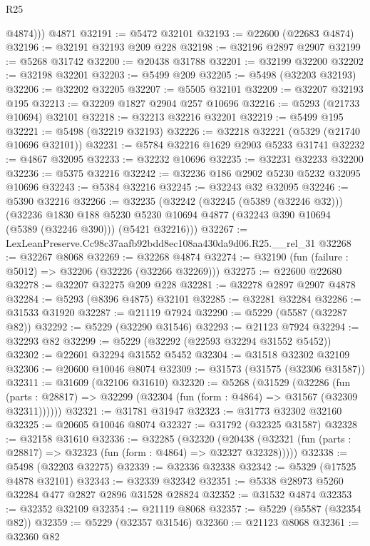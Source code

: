 \begin{lexlean}{R25}
\begin{coremodule}
          @4874)))
    @4871
@32191 := @5472 @32101
@32193 := @22600 (@22683 @4874)
@32196 := @32191 @32193 @209 @228
@32198 := @32196 @2897 @2907
@32199 := @5268 @31742
@32200 := @20438 @31788
@32201 := @32199 @32200
@32202 := @32198 @32201
@32203 := @5499 @209
@32205 := @5498 (@32203 @32193)
@32206 := @32202 @32205
@32207 := @5505 @32101
@32209 := @32207 @32193 @195
@32213 := @32209 @1827 @2904 @257 @10696
@32216 := @5293 (@21733 @10694) @32101
@32218 := @32213 @32216 @32201
@32219 := @5499 @195
@32221 := @5498 (@32219 @32193)
@32226 := @32218 @32221 (@5329 (@21740 @10696 @32101))
@32231 := @5784 @32216 @1629 @2903 @5233 @31741
@32232 := @4867 @32095
@32233 := @32232 @10696
@32235 := @32231 @32233 @32200
@32236 := @5375 @32216
@32242 := @32236 @186 @2902 @5230 @5232 @32095 @10696
@32243 := @5384 @32216
@32245 := @32243 @32 @32095
@32246 := @5390 @32216
@32266 := @32235
    (@32242
      (@32245 (@5389 (@32246 @32)))
      (@32236
        @1830
        @188
        @5230
        @5230
        @10694
        @4877
        (@32243 @390 @10694 (@5389 (@32246 @390)))
        (@5421 @32216)))
@32267 := LexLeanPreserve.Cc98c37aafb92bdd8ec108aa430da9d06.R25.__rel_31
@32268 := @32267 @8068
@32269 := @32268 @4874
@32274 := @32190 (fun (failure : @5012) => @32206 (@32226 (@32266 @32269)))
@32275 := @22600 @22680
@32278 := @32207 @32275 @209 @228
@32281 := @32278 @2897 @2907 @4878
@32284 := @5293 (@8396 @4875) @32101
@32285 := @32281 @32284
@32286 := @31533 @31920
@32287 := @21119 @7924
@32290 := @5229 (@5587 (@32287 @82))
@32292 := @5229 (@32290 @31546)
@32293 := @21123 @7924
@32294 := @32293 @82
@32299 := @5229 (@32292 (@22593 @32294 @31552 @5452))
@32302 := @22601 @32294 @31552 @5452
@32304 := @31518 @32302 @32109
@32306 := @20600 @10046 @8074
@32309 := @31573 (@31575 (@32306 @31587))
@32311 := @31609 (@32106 @31610)
@32320 := @5268
    (@31529
      (@32286
        (fun (parts : @28817) => @32299 (@32304 (fun (form : @4864) => @31567 (@32309 @32311))))))
@32321 := @31781 @31947
@32323 := @31773 @32302 @32160
@32325 := @20605 @10046 @8074
@32327 := @31792 (@32325 @31587)
@32328 := @32158 @31610
@32336 := @32285
    (@32320
      (@20438 (@32321 (fun (parts : @28817) => @32323 (fun (form : @4864) => @32327 @32328)))))
@32338 := @5498 (@32203 @32275)
@32339 := @32336 @32338
@32342 := @5329 (@17525 @4878 @32101)
@32343 := @32339 @32342
@32351 := @5338 @28973 @5260 @32284 @477 @2827 @2896 @31528 @28824
@32352 := @31532 @4874
@32353 := @32352 @32109
@32354 := @21119 @8068
@32357 := @5229 (@5587 (@32354 @82))
@32359 := @5229 (@32357 @31546)
@32360 := @21123 @8068
@32361 := @32360 @82

\end{coremodule}
\end{lexlean}
